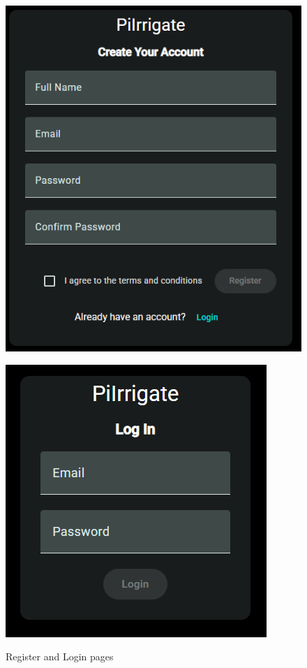 \begin{figure}[H]
   \centering
    \begin{minipage}{0.3\textwidth}
        \centering
        \includegraphics[width=\textwidth]{images/register_page.png}
        \label{fig:register-page}
    \end{minipage}\hfill
    \begin{minipage}{0.3\textwidth}
        \centering
        \includegraphics[width=\textwidth]{images/login.png}
        \label{fig:login-page}
    \end{minipage}
    \caption{Register and Login pages}
\end{figure}

